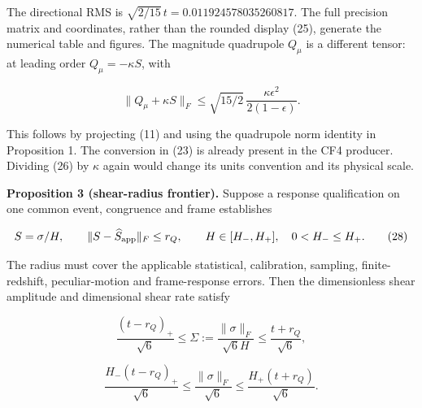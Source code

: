 \documentclass[aps,prd,reprint,onecolumn,11pt,nofootinbib,notitlepage]{revtex4-2}
\begin{document}
The directional RMS is \(\sqrt{2/15}\,t=0.011924578035260817\). The full precision matrix and coordinates, rather than the rounded display (25), generate the numerical table and figures. The magnitude quadrupole \(Q_\mu\) is a different tensor: at leading order \(Q_\mu=-\kappa S\), with

\begin{equation}
 \|Q_\mu+\kappa S\|_F\le\sqrt{15/2}\,
 \frac{\kappa\epsilon^2}{2(1-\epsilon)} .\tag{27}
\end{equation}

This follows by projecting (11) and using the quadrupole norm identity in Proposition 1. The conversion in (23) is already present in the CF4 producer. Dividing (26) by \(\kappa\) again would change its units convention and its physical scale.


\begin{table}[tb]
\caption{Retained apparent tensor in the dimensionless J2000 source basis (24). Singular values use the retained working metric. All central values are generated from full precision retained inputs.}

\end{table}
\begin{table}[tb]
\caption{Conditional frontier for assumed $r_Q$ and assumed $r_H/H_*=0.1$. Rate columns mean $\|\sigma\|_F/(\sqrt6 H_*)$. The zero-radius row is an exact-response limiting scenario, without a calibrated physical error estimate.}

\end{table}

\textbf{Proposition 3 (shear-radius frontier).} Suppose a response qualification on one common event, congruence and frame establishes

\begin{equation}
 S=\sigma/H,\qquad
 \|S-\widehat S_{\rm app}\|_F\le r_Q,\qquad
 H\in[H_-,H_+],\quad 0<H_-\le H_+ .\tag{28}
\end{equation}

The radius must cover the applicable statistical, calibration, sampling, finite-redshift, peculiar-motion and frame-response errors. Then the dimensionless shear amplitude and dimensional shear rate satisfy

\begin{equation}
 \frac{(t-r_Q)_+}{\sqrt6}\le
 \Sigma:=\frac{\|\sigma\|_F}{\sqrt6 H}
 \le\frac{t+r_Q}{\sqrt6},\tag{29}
\end{equation}

\begin{equation}
 \frac{H_-(t-r_Q)_+}{\sqrt6}\le
 \frac{\|\sigma\|_F}{\sqrt6}
 \le\frac{H_+(t+r_Q)}{\sqrt6}.\tag{30}
\end{equation}
\end{document}
